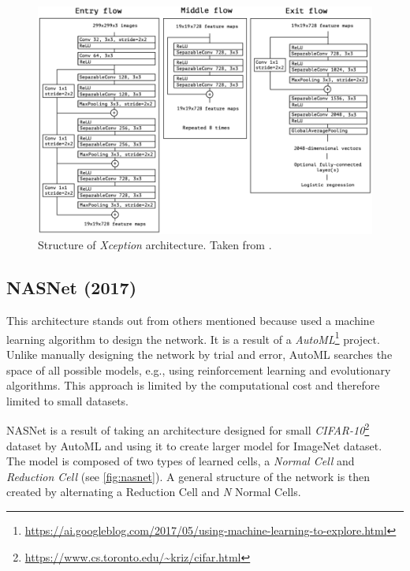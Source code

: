 \begin{figure}
    \includegraphics[width=\textwidth]{img/xception}
    \caption[Xception architecture]%
    {Structure of \textit{Xception} architecture. Taken from \cite[fig. 5]{bib:xception}.}
    \label{fig:xception}
\end{figure}


\subsection{NASNet (2017)}
\label{sec:nasnet}
This architecture stands out from others mentioned because \citeauthor{bib:nasnet} \cite{bib:nasnet} used a machine learning algorithm to design the network. It is a result of a \textit{AutoML}\footnote{\url{https://ai.googleblog.com/2017/05/using-machine-learning-to-explore.html}} project. Unlike manually designing the network by trial and error, AutoML searches the space of all possible models, e.g., using reinforcement learning and evolutionary algorithms. This approach is limited by the computational cost and therefore limited to small datasets.

NASNet is a result of taking an architecture designed for small \textit{CIFAR-10}\footnote{\url{https://www.cs.toronto.edu/~kriz/cifar.html}} dataset by AutoML and using it to create larger model for ImageNet dataset. The model is composed of two types of learned cells, a \textit{Normal Cell} and \textit{Reduction Cell} (see \cref{fig:nasnet}). A general structure of the network is then created by alternating a Reduction Cell and \textit{N} Normal Cells.

